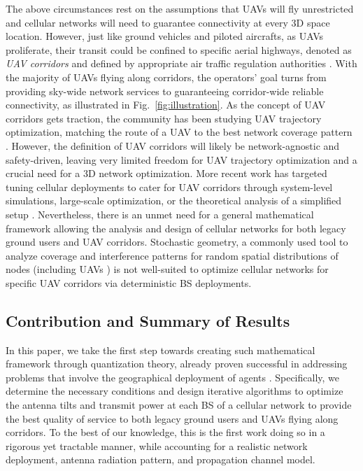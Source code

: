 The above circumstances rest on the assumptions that UAVs will fly unrestricted and cellular networks will need to guarantee connectivity at every 3D space location. However, just like ground vehicles and piloted aircrafts, as UAVs proliferate, their transit could be confined to specific aerial highways, denoted as \emph{UAV corridors} and defined by appropriate air traffic regulation authorities \cite{CheJaaYan2020,BhuGuvDai2021}. 
With the majority of UAVs flying along corridors, the operators' goal turns from providing sky-wide network services to guaranteeing corridor-wide reliable connectivity, as illustrated in Fig.~\ref{fig:illustration}. 
As the concept of UAV corridors gets traction, the community has been studying UAV trajectory optimization, matching the route of a UAV to the best network coverage pattern \cite{BulGuv2018,ChaSaaBet2018,EsrGanGes2020,BayTheCac2021}. However, the definition of UAV corridors will likely be network-agnostic and safety-driven, leaving very limited freedom for UAV trajectory optimization and a crucial need for a 3D network optimization. 
More recent work has targeted tuning cellular deployments to cater for UAV corridors through system-level simulations, large-scale optimization, or the theoretical analysis of a simplified setup \cite{MaeChoGuv2021,ChoGuvSaa2021,SinBhaOzt2021,BerLopGes2022,BerLopPio2023}. 
Nevertheless, there is an unmet need for a general mathematical framework allowing the analysis and design of cellular networks for both legacy ground users and UAV corridors. 
Stochastic geometry, a commonly used tool to analyze coverage and interference patterns for random spatial distributions of nodes (including UAVs \cite{azari2019cellular,AzaGerGar2020}) is not well-suited to optimize cellular networks for specific UAV corridors via deterministic BS deployments. 


\subsection{Contribution and Summary of Results}

In this paper, we take the first step towards creating such mathematical framework through quantization theory, already proven successful in addressing problems that involve the
geographical deployment of agents \cite{GuoJaf2016, cortes2005spatially, guo2018source, ingle2011energy, guo2019movement, cortes2004coverage, karimi2020energy, tang2019three, karimi2021energy, wang2006movement, 9086619,8519749}. Specifically, we determine the necessary conditions and design iterative algorithms to optimize the antenna tilts and transmit power at each BS of a cellular network to provide the best quality of service to both legacy ground users and UAVs flying along corridors. To the best of our knowledge, this is the first work doing so in a rigorous yet tractable manner, while accounting for a realistic network deployment, antenna radiation pattern, and propagation channel model. 

